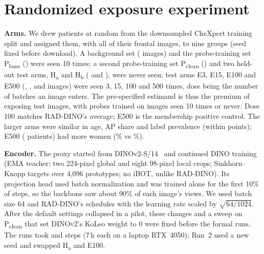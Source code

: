 \documentclass{article}
\begin{document}
\section{Randomized exposure experiment}\label{sec:design}
\textbf{Arms.} We drew \NPatients{} patients at random from the downsampled CheXpert training split and assigned them, with all \NFrontal{} of their frontal images, to nine groups (seed fixed before download). A background set (\NB{} images) and the probe-training set P\textsubscript{base} (\NPbase) were seen 10 times; a second probe-training set P\textsubscript{clean} (\NPclean) and two held-out test arms, H\textsubscript{a} and H\textsubscript{b} (\NHa{} and \NHb), were never seen; test arms E3, E15, E100 and E500 (\NEThree, \NEFifteen, \NEHundred{} and \NEFiveHundred{} images) were seen 3, 15, 100 and 500 times, dose being the number of batches an image enters. The pre-specified estimand is thus the premium of exposing test images, with probes trained on images seen 10 times or never. Dose 100 matches RAD-DINO's average; E500 is the membership positive control. The larger arms were similar in age, AP share and label prevalence (within \PrevSpread{} points); E500 (\EFiveHundredPatients{} patients) had more women (\FemaleEFiveHundred\% vs \FemaleLarger\%).

\textbf{Encoder.} The proxy started from DINOv2-S/14~\cite{oquab2024dinov2} and continued DINO training (EMA teacher; two 224-pixel global and eight 98-pixel local crops; Sinkhorn--Knopp targets over 4{,}096 prototypes; no iBOT, unlike RAD-DINO). Its projection head used batch normalization and was trained alone for the first 10\% of steps, so the backbone saw about 90\% of each image's views. We used batch size 64 and RAD-DINO's schedules with the learning rate scaled by $\sqrt{64/1024}$. After the default settings collapsed in a pilot, these changes and a sweep on P\textsubscript{clean} that set DINOv2's KoLeo weight to 0 were fixed before the formal runs. The runs took \StepsOne{} and \StepsTwo{} steps (7\,h each on a laptop RTX~4050); Run~2 used a new seed and swapped H\textsubscript{a} and E100.
\end{document}
